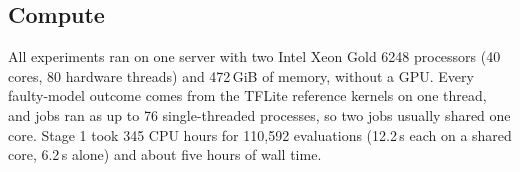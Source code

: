 \subsection{Compute}\label{sec:cost}
All experiments ran on one server with two Intel Xeon Gold 6248 processors (40 cores, 80 hardware threads) and 472\,GiB of memory, without a GPU. Every faulty-model outcome comes from the TFLite reference kernels on one thread, and jobs ran as up to 76 single-threaded processes, so two jobs usually shared one core. Stage 1 took 345 CPU hours for 110,592 evaluations (12.2\,s each on a shared core, 6.2\,s alone) and about five hours of wall time. 

